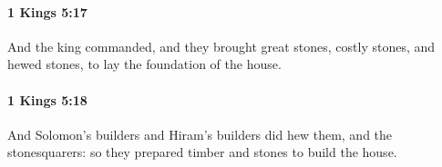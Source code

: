 		\paragraph{1 Kings 5:17} %
			\label{1KINGS-5-17}

			And the king commanded, and they brought great stones, costly stones, and hewed stones, to lay the foundation of the house.


		\paragraph{1 Kings 5:18} %
			\label{1KINGS-5-18}

			And Solomon’s builders and Hiram’s builders did hew them, and the stonesquarers: so they prepared timber and stones to build the house.

